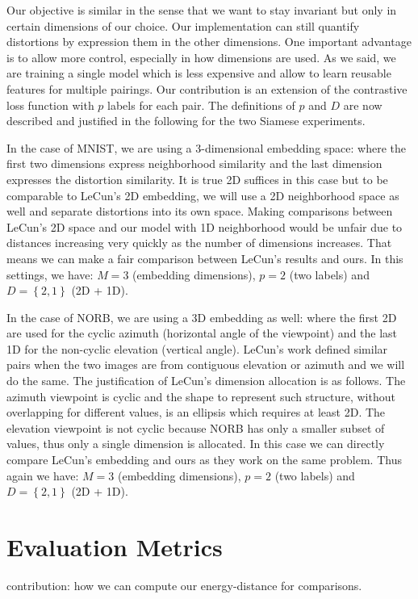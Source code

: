 \documentclass[a4paper,12pt]{report}
\begin{document}
Our objective is similar in the sense that we want to stay invariant but only in certain dimensions of our choice.
Our implementation can still quantify distortions by expression them in the other dimensions.
One important advantage is to allow more control, especially in how dimensions are used.
As we said, we are training a single model which is less expensive and allow to learn reusable features for multiple pairings.
Our contribution is an extension of the contrastive loss function with $p$ labels for each pair.
The definitions of $p$ and $D$ are now described and justified in the following for the two Siamese experiments.

In the case of MNIST, we are using a 3-dimensional embedding space: where the first two dimensions express neighborhood similarity and the last dimension expresses the distortion similarity.
It is true 2D suffices in this case but to be comparable to LeCun's 2D embedding, we will use a 2D neighborhood space as well and separate distortions into its own space.
Making comparisons between LeCun's 2D space and our model with 1D neighborhood would be unfair due to distances increasing very quickly as the number of dimensions increases.
That means we can make a fair comparison between LeCun's results and ours.
In this settings, we have: $M=3$ (embedding dimensions), $p = 2$ (two labels) and $D = \left\{ 2, 1 \right\}$ (2D + 1D).

In the case of NORB, we are using a 3D embedding as well: where the first 2D are used for the cyclic azimuth (horizontal angle of the viewpoint) and the last 1D for the non-cyclic elevation (vertical angle).
LeCun's work defined similar pairs when the two images are from contiguous elevation or azimuth and we will do the same.
The justification of LeCun's dimension allocation is as follows.
The azimuth viewpoint is cyclic and the shape to represent such structure, without overlapping for different values, is an ellipsis which requires at least 2D.
The elevation viewpoint is not cyclic because NORB has only a smaller subset of values, thus only a single dimension is allocated.
In this case we can directly compare LeCun's embedding and ours as they work on the same problem.
Thus again we have: $M=3$ (embedding dimensions), $p = 2$ (two labels) and $D = \left\{ 2, 1 \right\}$ (2D + 1D).

\section{Evaluation Metrics}
contribution: how we can compute our energy-distance for comparisons.
\end{document}
